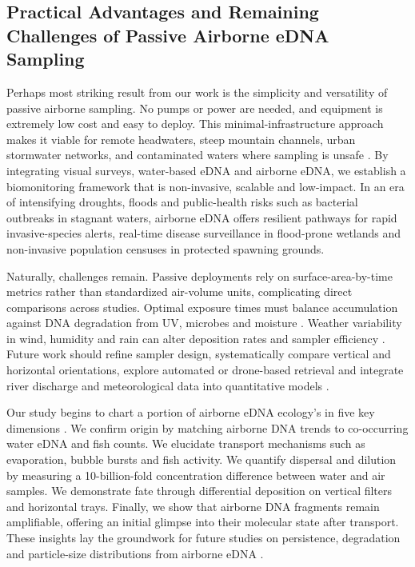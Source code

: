 \documentclass{article}
\begin{document}
\subsection{Practical Advantages and Remaining Challenges of Passive Airborne eDNA Sampling}
Perhaps most striking result from our work is the simplicity and versatility of passive airborne sampling. No pumps or power are needed, and equipment is extremely low cost and easy to deploy. This minimal-infrastructure approach makes it viable for remote headwaters, steep mountain channels, urban stormwater networks, and contaminated waters where sampling is unsafe \cite{harrison2019,bagley2019}. By integrating visual surveys, water-based eDNA and airborne eDNA, we establish a biomonitoring framework that is non-invasive, scalable and low-impact. In an era of intensifying droughts, floods and public-health risks such as bacterial outbreaks in stagnant waters, airborne eDNA offers resilient pathways for rapid invasive-species alerts, real-time disease surveillance in flood-prone wetlands and non-invasive population censuses in protected spawning grounds.

Naturally, challenges remain. Passive deployments rely on surface-area-by-time metrics rather than standardized air-volume units, complicating direct comparisons across studies. Optimal exposure times must balance accumulation against DNA degradation from UV, microbes and moisture \cite{brandao-dias2023}. Weather variability in wind, humidity and rain can alter deposition rates and sampler efficiency \cite{johnson2023,johnson2024}. Future work should refine sampler design, systematically compare vertical and horizontal orientations, explore automated or drone-based retrieval and integrate river discharge and meteorological data into quantitative models \cite{galban2021,kirchgeorg2024,shogren2017,wood2021}.

Our study begins to chart a portion of airborne eDNA ecology's in five key dimensions \cite{johnson2024}. We confirm origin by matching airborne DNA trends to co-occurring water eDNA and fish counts. We elucidate transport mechanisms such as evaporation, bubble bursts and fish activity. We quantify dispersal and dilution by measuring a 10-billion-fold concentration difference between water and air samples. We demonstrate fate through differential deposition on vertical filters and horizontal trays. Finally, we show that airborne DNA fragments remain amplifiable, offering an initial glimpse into their molecular state after transport. These insights lay the groundwork for future studies on persistence, degradation and particle-size distributions from airborne eDNA \cite{brandao-dias2025}.
\end{document}
